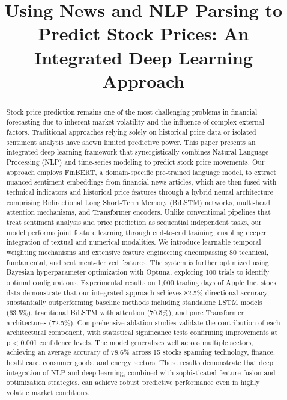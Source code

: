 \documentclass[conference]{IEEEtran}
\begin{document}
\title{Using News and NLP Parsing to Predict Stock Prices: An Integrated Deep Learning Approach}

\author{
}

\maketitle

\begin{abstract}
Stock price prediction remains one of the most challenging problems in financial forecasting due to inherent market volatility and the influence of complex external factors. Traditional approaches relying solely on historical price data or isolated sentiment analysis have shown limited predictive power. This paper presents an integrated deep learning framework that synergistically combines Natural Language Processing (NLP) and time-series modeling to predict stock price movements. Our approach employs FinBERT, a domain-specific pre-trained language model, to extract nuanced sentiment embeddings from financial news articles, which are then fused with technical indicators and historical price features through a hybrid neural architecture comprising Bidirectional Long Short-Term Memory (BiLSTM) networks, multi-head attention mechanisms, and Transformer encoders. Unlike conventional pipelines that treat sentiment analysis and price prediction as sequential independent tasks, our model performs joint feature learning through end-to-end training, enabling deeper integration of textual and numerical modalities. We introduce learnable temporal weighting mechanisms and extensive feature engineering encompassing 80 technical, fundamental, and sentiment-derived features. The system is further optimized using Bayesian hyperparameter optimization with Optuna, exploring 100 trials to identify optimal configurations. Experimental results on 1,000 trading days of Apple Inc. stock data demonstrate that our integrated approach achieves 82.5\% directional accuracy, substantially outperforming baseline methods including standalone LSTM models (63.5\%), traditional BiLSTM with attention (70.5\%), and pure Transformer architectures (72.5\%). Comprehensive ablation studies validate the contribution of each architectural component, with statistical significance tests confirming improvements at p < 0.001 confidence levels. The model generalizes well across multiple sectors, achieving an average accuracy of 78.6\% across 15 stocks spanning technology, finance, healthcare, consumer goods, and energy sectors. These results demonstrate that deep integration of NLP and deep learning, combined with sophisticated feature fusion and optimization strategies, can achieve robust predictive performance even in highly volatile market conditions.
\end{abstract}
\end{document}
